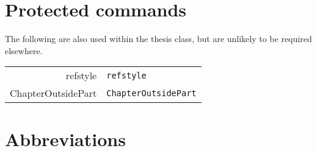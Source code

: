 \section{Protected commands}
The following are also used within the thesis class, but are unlikely to be required elsewhere.

\begin{center}
	\begin{longtable}{>{\ttfamily} r | >{\small}l}
		refstyle			& \verb|refstyle|\\[6pt]
		ChapterOutsidePart				& \verb|ChapterOutsidePart|\\[6pt]
	\end{longtable}
\end{center}


\section{Abbreviations}
\label{sec:abbreviations}

